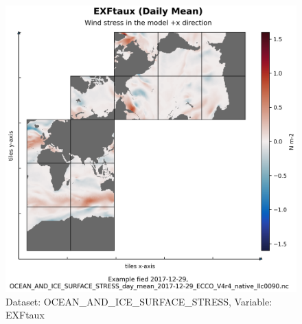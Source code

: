 \begin{figure}[H]
\centering
\includegraphics[scale=0.55]{../images/plots/native_plots/Ocean_and_Sea-Ice_Surface_Stress/EXFtaux.png}
\caption{Dataset: OCEAN\_AND\_ICE\_SURFACE\_STRESS, Variable: EXFtaux}
\label{tab:table-OCEAN_AND_ICE_SURFACE_STRESS_EXFtaux-Plot}
\end{figure}
\pagebreak
